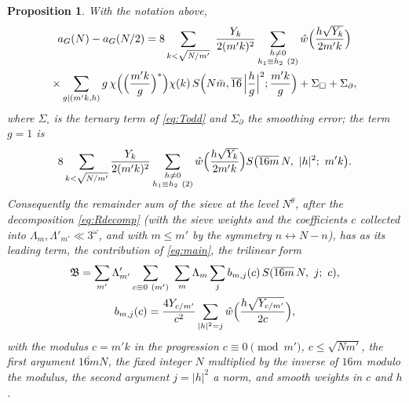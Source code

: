 \documentclass[11pt]{amsart}
\newtheorem{proposition}[theorem]{Proposition}
\theoremstyle{remark}
\begin{document}
\begin{proposition}\label{prop:dispersion}
With the notation above,
\begin{multline*}
a_G(N)-a_G(N/2)=8\sum_{k<\sqrt{N/m'}}\ \frac{Y_k}{2(m'k)^2}\sum_{\substack{h\ne0\\ h_1\equiv h_2\ (2)}}\hat w\Bigl(\frac{h\sqrt{Y_k}}{2m'k}\Bigr)\\
\times\sum_{g\mid(m'k,h)}g\,\chi\Bigl(\Bigl(\frac{m'k}{g}\Bigr)^{*}\Bigr)\chi(k)\,S\Bigl(N\bar m,\overline{16}\,\Bigl|\frac hg\Bigr|^2;\frac{m'k}g\Bigr)+\Sigma_\square+\Sigma_\partial,
\end{multline*}
where $\Sigma_\square$ is the ternary term of \eqref{eq:Todd} and $\Sigma_\partial$ the smoothing error; the term $g=1$ is
\begin{equation}\label{eq:main}
8\sum_{k<\sqrt{N/m'}}\frac{Y_k}{2(m'k)^2}\sum_{\substack{h\ne0\\ h_1\equiv h_2\ (2)}}\hat w\Bigl(\frac{h\sqrt{Y_k}}{2m'k}\Bigr)S\bigl(\overline{16m}\,N,\ |h|^2;\ m'k\bigr).
\end{equation}
Consequently the remainder sum of the sieve at the level $N^\theta$, after the decomposition \eqref{eq:Rdecomp} (with the sieve weights and the coefficients $c$ collected into $\Lambda_m,\Lambda'_{m'}\ll3^{\omega}$, and with $m\le m'$ by the symmetry $n\leftrightarrow N-n$), has as its leading term, the contribution of \eqref{eq:main}, the trilinear form
\begin{multline}\label{eq:trilinear}
\mathfrak B=\sum_{m'}\Lambda'_{m'}\sum_{c\equiv0\ (m')}\ \sum_{m}\Lambda_m\sum_{j}b_{m,j}(c)\,S(\overline{16m}\,N,\ j;\ c),\\
b_{m,j}(c)=\frac{4Y_{c/m'}}{c^2}\sum_{|h|^2=j}\hat w\Bigl(\frac{h\sqrt{Y_{c/m'}}}{2c}\Bigr),
\end{multline}
with the modulus $c=m'k$ in the progression $c\equiv0\pmod{m'}$, $c\le\sqrt{Nm'}$, the first argument $\overline{16m}N$, the fixed integer $N$ multiplied by the inverse of $16m$ modulo the modulus, the second argument $j=|h|^2$ a norm, and smooth weights in $c$ and $h$.
\end{proposition}
\end{document}
